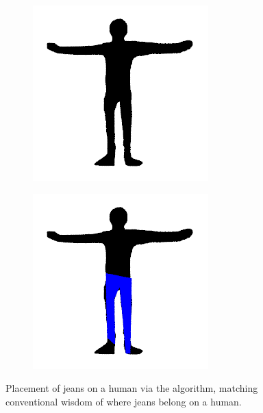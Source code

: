 \documentclass[twocolumn]{article}
\begin{document}
\begin{figure}
    \begin{subfigure}{0.23\textwidth}
        \includegraphics[width=0.92\linewidth]{img/person/target.png}
    \end{subfigure}
    \begin{subfigure}{0.23\textwidth}
        \includegraphics[width=0.92\linewidth]{img/person/iter_99.png}
    \end{subfigure}
    \caption{Placement of jeans on a human via the algorithm, matching conventional wisdom of where jeans belong on a human.}
    \label{fig:person}
\end{figure}
\end{document}
